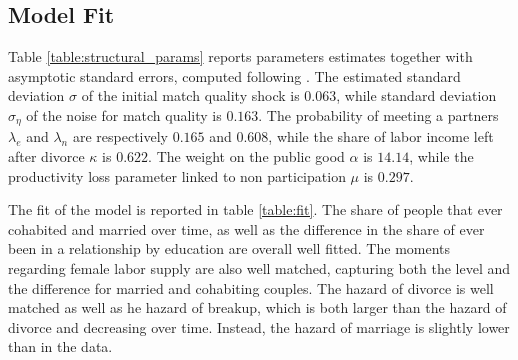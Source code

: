 \documentclass[12pt]{article}
\begin{document}
 \subsection{Model Fit}
 Table \ref{table:structural_params} reports parameters estimates together with asymptotic standard errors, computed following \cite{adda2003}. The estimated standard deviation $\sigma$  of the initial match quality shock is $0.063$, while standard deviation $\sigma_{\eta}$ of the noise for match quality is $0.163$. The probability of meeting a partners $\lambda_e$ and $\lambda_n$ are respectively $0.165$ and $0.608$, while the share of labor income left after divorce $\kappa$ is $0.622$. The weight on the public good $\alpha$ is $14.14$, while the productivity loss parameter linked to non participation $\mu$ is $0.297$. 
 
 The fit of the model is reported in table \ref{table:fit}. The share of people that ever cohabited and married over time, as well as the difference in the share of ever been in a relationship by education are overall well fitted.  The moments regarding female labor supply are also well matched, capturing both the level and the difference for married and cohabiting couples. The hazard of divorce is well matched as well as he hazard of breakup, which is both larger than the hazard of divorce and decreasing over time. Instead, the hazard of marriage is slightly lower than in the data.
 
\end{document}
